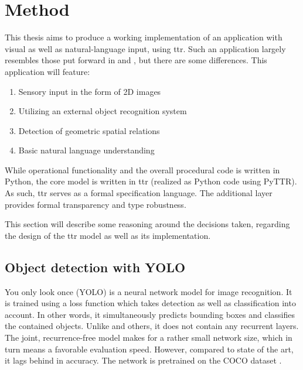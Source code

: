 \section{Method}
\label{sec:method}

This thesis aims to produce a working implementation of an application with visual as well as natural-language input, using \gls{ttr}.
Such an application largely resembles those put forward in \cite{ttrspat} and \cite{lspc}, but there are some differences.
This application will feature:

\begin{enumerate}
\item Sensory input in the form of 2D images
\item Utilizing an external object recognition system
\item Detection of geometric spatial relations
\item Basic natural language understanding
\end{enumerate}

While operational functionality and the overall procedural code is written in Python, the core model is written in \gls{ttr} (realized as Python code using PyTTR).
As such, \gls{ttr} serves as a formal specification language.
The additional layer provides formal transparency and type robustness.

This section will describe some reasoning around the decisions taken, regarding the design of the \gls{ttr} model as well as its implementation.



\subsection{Object detection with YOLO}

You only look once (YOLO) \citep{RedmonYouOnlyLook2015} is a neural network model for image recognition.
It is trained using a loss function which takes detection as well as classification into account.
In other words, it simultaneously predicts bounding boxes and classifies the contained objects.
Unlike \cite{HeMaskRCNN2017} and others, it does not contain any recurrent layers.
The joint, recurrence-free model makes for a rather small network size, which in turn means a favorable evaluation speed.
However, compared to state of the art, it lags behind in accuracy.
The network is pretrained on the COCO dataset \cite{LinMicrosoftCOCOCommon2014}.

